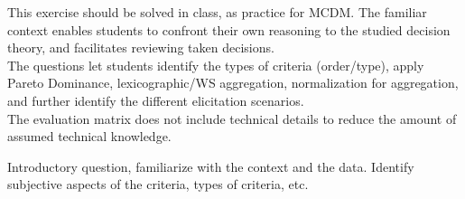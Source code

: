 \documentclass[answers, 10pt, UKenglish]{exam}
\begin{document}
\begin{questions}
\begin{solutionorbox}
	{
		\color{red}
		
		This exercise should be solved in class, as practice for MCDM.
		The familiar context enables students to confront their own
		reasoning to the studied decision theory, and facilitates
		reviewing taken decisions.\\

		The questions let students identify the types of criteria
		(order/type), apply Pareto Dominance, lexicographic/WS
		aggregation, normalization for aggregation, and further
		identify the different elicitation scenarios.\\

		The evaluation matrix does not include technical details to
		reduce the amount of assumed technical knowledge.
	}
\end{solutionorbox}
	\question
	
	
	\begin{solutionorbox}
	{ 
		\color{red} Introductory question, familiarize with the context
		and the data. Identify subjective aspects of the criteria, types 
		of criteria, etc.

}
\end{solutionorbox}
\end{questions}
\end{document}

